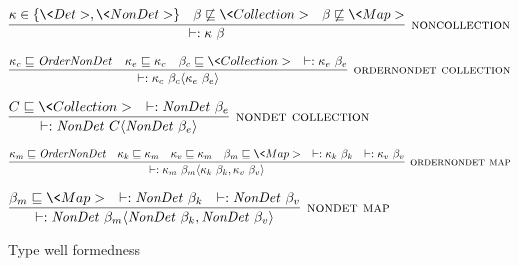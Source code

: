 \begin{figure}
    $\infer[\rulename{noncollection}]
    {\wellformed{\kappa \  \beta}}
    {\kappa \in \{ \<Det>, \<NonDet> \} & \beta \not\sqsubseteq \<Collection> & \beta \not\sqsubseteq \<Map>}$
    
    \bigskip
    
    $\infer[\rulename{ordernondet collection}]
    {\wellformed{\kappa_c \  \beta_c \angles{\kappa_e \ \beta_e}}}
    {\kappa_c \sqsubseteq \|OrderNonDet| & \kappa_e \sqsubseteq \kappa_c &
      \beta_c \sqsubseteq \<Collection> & \wellformed{\kappa_e \ \beta_e}}$
    
    \bigskip
    
    $\infer[\rulename{nondet collection}]
    {\wellformed{\|NonDet| \ C\angles{\|NonDet| \ \beta_e}}}
    {C \sqsubseteq \<Collection> & \wellformed{\|NonDet| \ \beta_e}}$
    
    \bigskip
    
%     
%     
%     
    
    $\infer[\rulename{ordernondet map}]
    {\wellformed{\kappa_m \  \beta_m \angles{\kappa_k \ \beta_k, \kappa_v \ \beta_v}}}
    {\kappa_m \sqsubseteq \|OrderNonDet|
      & \kappa_k \sqsubseteq \kappa_m
      & \kappa_v \sqsubseteq \kappa_m
      & \beta_m \sqsubseteq \<Map>
      & \wellformed{\kappa_k \ \beta_k}
      & \wellformed{\kappa_v \ \beta_v}
    }$
    
    \bigskip
    
    $\infer[\rulename{nondet map}]
    {\wellformed{\|NonDet| \ \beta_m\angles{\|NonDet| \ \beta_k, \|NonDet| \ \beta_v}}}
    {\beta_m \sqsubseteq \<Map> & \wellformed{\|NonDet| \ \beta_k} & \wellformed{\|NonDet| \ \beta_v}}$
    
    \caption{Type well formedness}


  \label{type-validity}
\end{figure}

